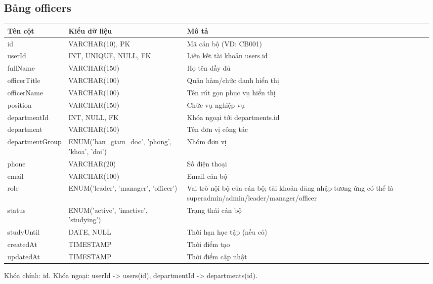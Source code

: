 \documentclass[18pt,a4paper]{report}
\begin{document}
\subsection{Bảng officers}
\begin{longtable}{|>{\raggedright\arraybackslash}p{4.5cm}|>{\raggedright\arraybackslash}p{4.5cm}|>{\raggedright\arraybackslash}p{6.5cm}|}
\hline
\textbf{Tên cột} & \textbf{Kiểu dữ liệu} & \textbf{Mô tả} \\ \hline
id & VARCHAR(10), PK & Mã cán bộ (VD: CB001) \\ \hline
userId & INT, UNIQUE, NULL, FK & Liên kết tài khoản users.id \\ \hline
fullName & VARCHAR(150) & Họ tên đầy đủ \\ \hline
officerTitle & VARCHAR(100) & Quân hàm/chức danh hiển thị \\ \hline
officerName & VARCHAR(100) & Tên rút gọn phục vụ hiển thị \\ \hline
position & VARCHAR(150) & Chức vụ nghiệp vụ \\ \hline
departmentId & INT, NULL, FK & Khóa ngoại tới departments.id \\ \hline
department & VARCHAR(150) & Tên đơn vị công tác \\ \hline
departmentGroup & ENUM('ban\_giam\_doc', 'phong', 'khoa', 'doi') & Nhóm đơn vị \\ \hline
phone & VARCHAR(20) & Số điện thoại \\ \hline
email & VARCHAR(100) & Email cán bộ \\ \hline
role & ENUM('leader', 'manager', 'officer') & Vai trò nội bộ của cán bộ; tài khoản đăng nhập tương ứng có thể là superadmin/admin/leader/manager/officer \\ \hline
status & ENUM('active', 'inactive', 'studying') & Trạng thái cán bộ \\ \hline
studyUntil & DATE, NULL & Thời hạn học tập (nếu có) \\ \hline
createdAt & TIMESTAMP & Thời điểm tạo \\ \hline
updatedAt & TIMESTAMP & Thời điểm cập nhật \\ \hline
\end{longtable}
Khóa chính: id. Khóa ngoại: userId -> users(id), departmentId -> departments(id).
\end{document}

